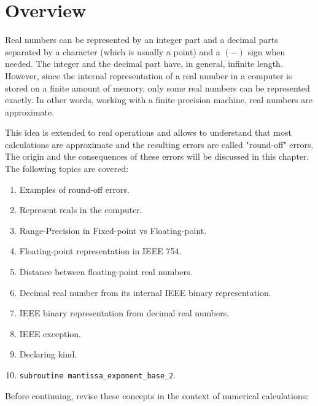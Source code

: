     \section*{Overview}

Real numbers can be represented by 
an integer part and a decimal parts separated by a character (which is usually a point) 
and a $(-)$ sign when needed. 
The integer and the decimal part have, in general, infinite length.  
However, since the internal representation of a real number 
in a computer  is stored on a finite amount of memory, 
only some real numbers can be represented exactly. 
In other words, working with a finite precision machine, real numbers are approximate.

This idea is extended to real operations and allows to understand that most calculations 
are approximate and the resulting errors are called "round-off" errors. 
The origin and the consequences of these errors will be discussed in this chapter. 
The following topics are covered: 

\begin{enumerate} 
    \setlength\itemsep{-0.1cm}
    \item Examples of round-off errors. 
    \item Represent reals in the computer.
    \item Range-Precision in Fixed-point vs Floating-point.
    \item Floating-point representation in IEEE 754.
    \item Distance between floating-point real numbers.
    \item Decimal real number from its internal IEEE binary representation.
    \item IEEE binary representation from decimal real numbers.    
    \item IEEE exception.
    \item Declaring kind.
    \item \texttt{subroutine mantissa\_exponent\_base\_2}.

\end{enumerate} 

Before continuing, revise these concepts in the context of numerical calculations:

